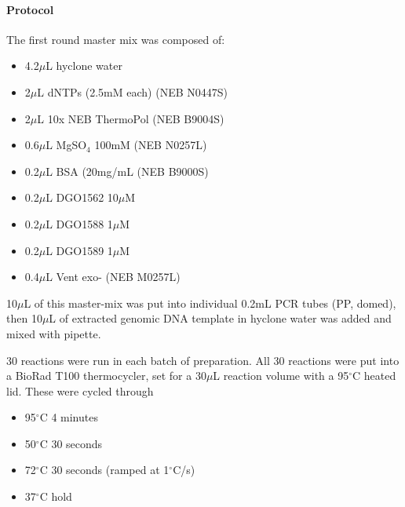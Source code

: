 {\pagebreak

\begin{figure}[h!]
  \raggedright
  \begin{minipage}{1cm}
    \caption{}
  \end{minipage}
  
\end{figure}

\label{fig:diagram} \pagebreak

\paragraph{Protocol}\label{protocol}

The first round master mix was composed of:

\begin{itemize}
\tightlist
\item
  4.2\(\mu\)L hyclone water
\item
  2\(\mu\)L dNTPs (2.5mM each) (NEB N0447S)
\item
  2\(\mu\)L 10x NEB ThermoPol (NEB B9004S)
\item
  0.6\(\mu\)L MgSO\(_4\) 100mM (NEB N0257L)
\item
  0.2\(\mu\)L BSA (20mg/mL (NEB B9000S)
\item
  0.2\(\mu\)L DGO1562 10\(\mu\)M
\item
  0.2\(\mu\)L DGO1588 1\(\mu\)M
\item
  0.2\(\mu\)L DGO1589 1\(\mu\)M
\item
  0.4\(\mu\)L Vent exo- (NEB M0257L)
\end{itemize}

10\(\mu\)L of this master-mix was put into individual 0.2mL PCR tubes
(PP, domed), then 10\(\mu\)L of extracted genomic DNA template in
hyclone water was added and mixed with pipette.

30 reactions were run in each batch of preparation. All 30 reactions
were put into a BioRad T100 thermocycler, set for a 30\(\mu\)L reaction
volume with a 95\(^{\circ}\)C heated lid. These were cycled through

\begin{itemize}
\tightlist
\item
  95\(^{\circ}\)C 4 minutes
\item
  50\(^{\circ}\)C 30 seconds
\item
  72\(^{\circ}\)C 30 seconds (ramped at 1\(^{\circ}\)C/s)
\item
  37\(^{\circ}\)C hold
\end{itemize}

}
